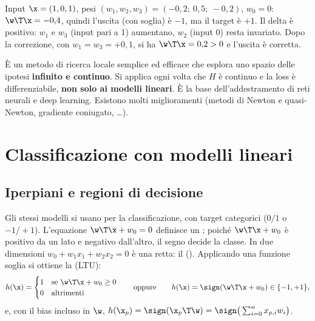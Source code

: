 \begin{esempio}
Input $\x = (1,0,1)$, pesi $(w_1,w_2,w_3) = (-0{,}2;\ 0{,}5;\ -0{,}2)$, $w_0=0$: $\w\T\x = -0{,}4$, quindi
l'uscita (con soglia) è $-1$, ma il target è $+1$. Il delta è positivo: $w_1$ e $w_3$ (input pari a 1) aumentano,
$w_2$ (input 0) resta invariato. Dopo la correzione, con $w_1=w_3=+0{,}1$, si ha $\w\T\x = 0{,}2>0$ e l'uscita è
corretta.
\end{esempio}

\begin{idea}
È un metodo di ricerca locale semplice ed efficace che esplora uno spazio delle ipotesi \textbf{infinito e
continuo}. Si applica ogni volta che $H$ è continuo e la loss è differenziabile, \textbf{non solo ai modelli
lineari}. È la base dell'addestramento di reti neurali e deep learning. Esistono molti miglioramenti (metodi di
Newton e quasi-Newton, gradiente coniugato, \dots).
\end{idea}

\section{Classificazione con modelli lineari}
\label{sec:classificazione-lineare}

\subsection{Iperpiani e regioni di decisione}

Gli stessi modelli si usano per la classificazione, con target categorici ($0/1$ o $-1/+1$). L'equazione
$\w\T\x + w_0 = 0$ definisce un ; poiché $\w\T\x+w_0$ è positivo da un lato e negativo
dall'altro, il segno decide la classe. In due dimensioni $w_0+w_1x_1+w_2x_2 = 0$ è una retta: il
 (). Applicando una funzione soglia si ottiene la
 (LTU):
\begin{equation}\label{eq:ltu}
h(\x) = \begin{cases}1 & \text{se } \w\T\x+w_0\ge 0\\ 0 & \text{altrimenti}\end{cases}
\qquad\text{oppure}\qquad h(\x) = \sign(\w\T\x+w_0) \in\{-1,+1\},
\end{equation}
e, con il bias incluso in $\w$, $h(\x_p) = \sign(\x_p\T\w) = \sign\big(\sum_{i=0}^n x_{p,i}w_i\big)$.


